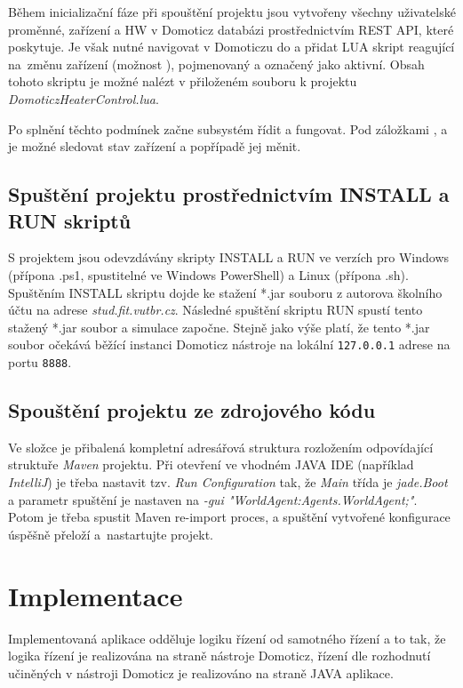 \documentclass[a4paper,12pt]{article}
\begin{document}
    Během inicializační fáze při spouštění projektu jsou vytvořeny všechny uživatelské proměnné, zařízení a HW v Domoticz databázi prostřednictvím REST API, které poskytuje. Je však nutné navigovat v Domoticzu do  a přidat LUA skript reagující na~změnu zařízení (možnost ), pojmenovaný  a označený jako aktivní. Obsah tohoto skriptu je možné nalézt v přiloženém souboru k projektu \textit{DomoticzHeaterControl.lua}.

    Po splnění těchto podmínek začne subsystém řídit a fungovat. Pod záložkami ,  a  je možné sledovat stav zařízení a popřípadě jej měnit. 

    \subsection{Spuštění projektu prostřednictvím INSTALL a RUN skriptů}
    S projektem jsou odevzdávány skripty INSTALL a RUN ve verzích pro Windows (přípona .ps1, spustitelné ve Windows PowerShell) a Linux (přípona .sh). Spuštěním INSTALL skriptu dojde ke stažení *.jar souboru z autorova školního účtu na adrese \textit{stud.fit.vutbr.cz}. Následné spuštění skriptu RUN spustí tento stažený *.jar soubor a simulace započne. Stejně jako výše platí, že tento *.jar soubor očekává běžící instanci Domoticz nástroje na lokální \texttt{127.0.0.1} adrese na portu \texttt{8888}.

    \subsection{Spouštění projektu ze zdrojového kódu}
    Ve složce  je přibalená kompletní adresářová struktura rozložením odpovídající struktuře \textit{Maven} projektu. Při otevření ve vhodném JAVA IDE (například \textit{IntelliJ}) je třeba nastavit tzv. \textit{Run Configuration} tak, že \textit{Main} třída je \textit{jade.Boot} a parametr spuštění je nastaven na \textit{-gui "WorldAgent:Agents.WorldAgent;"}. Potom je třeba spustit Maven re-import proces, a spuštění vytvořené konfigurace úspěšně přeloží a~nastartujte projekt.

    \section{Implementace}

    Implementovaná aplikace odděluje logiku řízení od samotného řízení a to tak, že logika řízení je realizována na straně nástroje Domoticz, řízení dle rozhodnutí učiněných v nástroji Domoticz je realizováno na straně JAVA aplikace.
    
\end{document}
